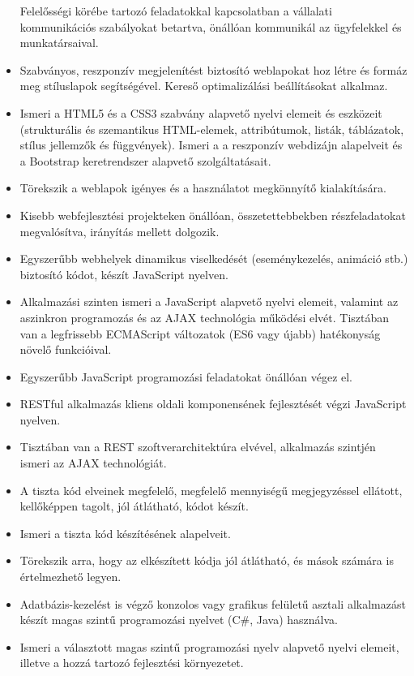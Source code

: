 \begin{itemize}
  Felelősségi körébe tartozó feladatokkal kapcsolatban a vállalati
  kommunikációs szabályokat betartva, önállóan kommunikál az ügyfelekkel
  és munkatársaival.
\item
  Szabványos, reszponzív megjelenítést biztosító weblapokat hoz létre és
  formáz meg stíluslapok segítségével. Kereső optimalizálási
  beállításokat alkalmaz.
\item
  Ismeri a HTML5 és a CSS3 szabvány alapvető nyelvi elemeit és eszközeit
  (strukturális és szemantikus HTML-elemek, attribútumok, listák,
  táblázatok, stílus jellemzők és függvények). Ismeri a a reszponzív
  webdizájn alapelveit és a Bootstrap keretrendszer alapvető
  szolgáltatásait.
\item
  Törekszik a weblapok igényes és a használatot megkönnyítő
  kialakítására.
\item
  Kisebb webfejlesztési projekteken önállóan, összetettebbekben
  részfeladatokat megvalósítva, irányítás mellett dolgozik.
\item
  Egyszerűbb webhelyek dinamikus viselkedését (eseménykezelés, animáció
  stb.) biztosító kódot, készít JavaScript nyelven.
\item
  Alkalmazási szinten ismeri a JavaScript alapvető nyelvi elemeit,
  valamint az aszinkron programozás és az AJAX technológia működési
  elvét. Tisztában van a legfrissebb ECMAScript változatok (ES6 vagy
  újabb) hatékonyság növelő funkcióival.
\item
  Egyszerűbb JavaScript programozási feladatokat önállóan végez el.
\item
  RESTful alkalmazás kliens oldali komponensének fejlesztését végzi
  JavaScript nyelven.
\item
  Tisztában van a REST szoftverarchitektúra elvével, alkalmazás szintjén
  ismeri az AJAX technológiát.
\item
  A tiszta kód elveinek megfelelő, megfelelő mennyiségű megjegyzéssel
  ellátott, kellőképpen tagolt, jól átlátható, kódot készít.
\item
  Ismeri a tiszta kód készítésének alapelveit.
\item
  Törekszik arra, hogy az elkészített kódja jól átlátható, és mások
  számára is értelmezhető legyen.
\item
  Adatbázis-kezelést is végző konzolos vagy grafikus felületű asztali
  alkalmazást készít magas szintű programozási nyelvet (C\#, Java)
  használva.
\item
  Ismeri a választott magas szintű programozási nyelv alapvető nyelvi
  elemeit, illetve a hozzá tartozó fejlesztési környezetet.

\end{itemize}

